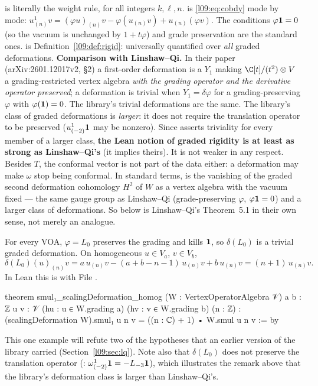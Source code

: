 \begin{dictionary}
 is literally the weight rule, for all integers $k,\ell,n$.  is
\eqref{l09:eq:cobdy} mode by mode: $u^1_{(n)}v = (\varphi u)_{(n)}v - \varphi(u_{(n)}v) +
u_{(n)}(\varphi v)$. The conditions $\varphi\mathbf{1} = 0$ (so the vacuum is unchanged by
$1+t\varphi$) and grade preservation are the standard ones.  is
Definition~\ref{l09:def:rigid}: universally quantified over \emph{all} graded deformations.
\textbf{Comparison with Linshaw--Qi.} In their paper (arXiv:2601.12017v2, \S2) a first-order
deformation is a $Y_1$ making $\C[t]/(t^2)\otimes V$ a grading-restricted vertex algebra \emph{with
the grading operator and the derivative operator preserved}; a deformation is trivial when
$Y_1 = \delta\varphi$ for a grading-preserving $\varphi$ with $\varphi(\mathbf{1})=0$. The library's
trivial deformations are the same. The library's class of graded deformations is \emph{larger}: it
does not require the translation operator to be preserved ($u^1_{(-2)}\mathbf{1}$ may be nonzero).
Since  asserts triviality for every member of a larger class, \textbf{the Lean
notion of graded rigidity is at least as strong as Linshaw--Qi's} (it implies theirs). It is not
weaker in any respect. Besides $T$, the conformal vector is not part of the data either: a deformation may
make $\omega$ stop being conformal. In standard terms,  is the vanishing of the graded
second deformation cohomology $H^2$ of $W$ as a vertex algebra with the vacuum fixed --- the same gauge group
as Linshaw--Qi (grade-preserving $\varphi$, $\varphi\mathbf{1} = 0$) and a larger class of deformations. So
 below is Linshaw--Qi's Theorem~5.1 in their own sense, not merely an analogue.
\end{dictionary}

\begin{example}\label{l09:ex:scaling}
For every VOA, $\varphi = L_0$ preserves the grading and kills $\mathbf{1}$, so $\delta(L_0)$ is a
trivial graded deformation. On homogeneous $u\in V_a$, $v\in V_b$,
\begin{equation*}
  \delta(L_0)(u)_{(n)}v = a\,u_{(n)}v - (a+b-n-1)\,u_{(n)}v + b\,u_{(n)}v = (n+1)\,u_{(n)}v .
\end{equation*}
In Lean this is  with
\noindent File .
\begin{leancode}
theorem smul₁_scalingDeformation_homog (W : VertexOperatorAlgebra 𝒱) {a b : ℤ} {u v : 𝒱}
    (hu : u ∈ W.grading a) (hv : v ∈ W.grading b) (n : ℤ) :
    (scalingDeformation W).smul₁ u n v = ((n : ℂ) + 1) • W.smul u n v := by
\end{leancode}
This one example will refute two of the hypotheses that an earlier version of the library carried
(Section~\ref{l09:sec:lq}). Note also that $\delta(L_0)$ does not preserve the translation operator
(: $\omega^1_{(-2)}\mathbf{1} = -L_{-3}\mathbf{1}$), which
illustrates the remark above that the library's deformation class is larger than Linshaw--Qi's.
\end{example}

